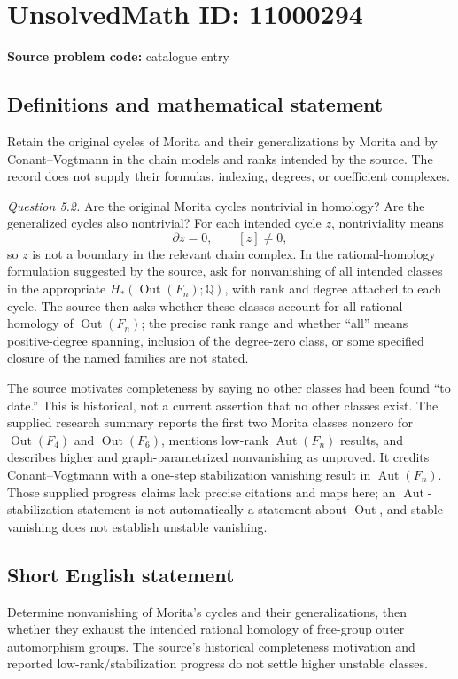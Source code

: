 \documentclass[11pt]{article}
\newcommand{\Q}{\mathbb{Q}}
\begin{document}
\section*{UnsolvedMath ID: 11000294}
\textbf{Source problem code:} catalogue entry
\subsection{Definitions and mathematical statement}
Retain the original cycles of Morita and their generalizations by Morita and by Conant--Vogtmann in the chain models and ranks intended by the source. The record does not supply their formulas, indexing, degrees, or coefficient complexes.

\emph{Question 5.2.} Are the original Morita cycles nontrivial in homology? Are the generalized cycles also nontrivial? For each intended cycle \(z\), nontriviality means
\[
 \partial z=0,\qquad [z]\neq0,
\]
so \(z\) is not a boundary in the relevant chain complex. In the rational-homology formulation suggested by the source, ask for nonvanishing of all intended classes in the appropriate \(H_*(\operatorname{Out}(F_n);\Q)\), with rank and degree attached to each cycle. The source then asks whether these classes account for all rational homology of \(\operatorname{Out}(F_n)\); the precise rank range and whether ``all'' means positive-degree spanning, inclusion of the degree-zero class, or some specified closure of the named families are not stated.

The source motivates completeness by saying no other classes had been found ``to date.'' This is historical, not a current assertion that no other classes exist. The supplied research summary reports the first two Morita classes nonzero for \(\operatorname{Out}(F_4)\) and \(\operatorname{Out}(F_6)\), mentions low-rank \(\operatorname{Aut}(F_n)\) results, and describes higher and graph-parametrized nonvanishing as unproved. It credits Conant--Vogtmann with a one-step stabilization vanishing result in \(\operatorname{Aut}(F_n)\). Those supplied progress claims lack precise citations and maps here; an \(\operatorname{Aut}\)-stabilization statement is not automatically a statement about \(\operatorname{Out}\), and stable vanishing does not establish unstable vanishing.
\subsection{Short English statement}
Determine nonvanishing of Morita's cycles and their generalizations, then whether they exhaust the intended rational homology of free-group outer automorphism groups. The source's historical completeness motivation and reported low-rank/stabilization progress do not settle higher unstable classes.
\end{document}
